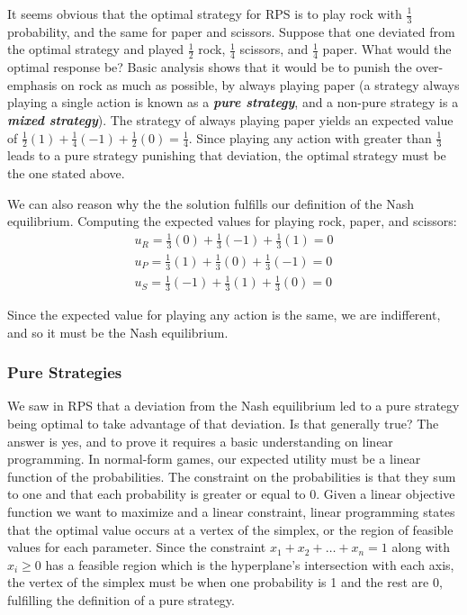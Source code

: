 \documentclass[11pt, oneside]{article}
\newcommand{\emphasis}[1]{\textbf{\textit{#1}}}
\begin{document}
It seems obvious that the optimal strategy for RPS is to play
rock with \( \frac{1}{3} \) probability, and the same for paper and scissors.
Suppose that one deviated from the optimal strategy and played
\( \frac{1}{2} \) rock, \( \frac{1}{4} \) scissors, and \( \frac{1}{4} \) paper.
What would the optimal response be?
Basic analysis shows that it would be to punish the over-emphasis on rock as much as possible,
by always playing paper (a strategy always playing a single action is known as a
\emphasis{pure strategy}, and a non-pure strategy is a \emphasis{mixed strategy}).
The strategy of always playing paper yields an expected value of
\( \frac{1}{2} (1) + \frac{1}{4} (-1) + \frac{1}{2} (0) = \frac{1}{4} \).
Since playing any action with greater than \( \frac{1}{3} \) leads to a pure strategy
punishing that deviation, the optimal strategy must be the one stated above.

We can also reason why the the solution fulfills our definition of the Nash equilibrium.
Computing the expected values for playing rock, paper, and scissors:
\begin{align*}
u_R = \frac{1}{3} (0) + \frac{1}{3} (-1) + \frac{1}{3} (1) = 0 \\
u_P = \frac{1}{3} (1) + \frac{1}{3} (0) + \frac{1}{3} (-1) = 0 \\
u_S = \frac{1}{3} (-1) + \frac{1}{3} (1) + \frac{1}{3} (0) = 0
\end{align*}

Since the expected value for playing any action is the same, we are indifferent, and
so it must be the Nash equilibrium.

\subsubsection{Pure Strategies}

We saw in RPS that a deviation from the Nash equilibrium led to a pure strategy
being optimal to take advantage of that deviation. Is that generally true?
The answer is yes, and to prove it requires a basic understanding on linear programming.
In normal-form games, our expected utility must be a linear function of
the probabilities. The constraint on the probabilities is that they sum to one
and that each probability is greater or equal to 0.
Given a linear objective function we want to maximize and a linear constraint,
linear programming states that the optimal value occurs at a vertex of the simplex,
or the region of feasible values for each parameter.
Since the constraint \( x_1 + x_2 + \dots + x_n = 1 \) along with \( x_i \geq 0 \)
has a feasible region which is the hyperplane's intersection with each axis,
the vertex of the simplex must be when one probability is 1 and the rest are 0,
fulfilling the definition of a pure strategy.
\end{document}
